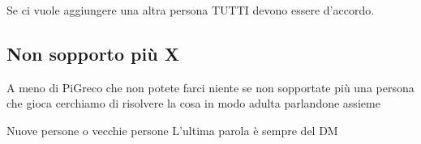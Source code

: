 Se ci vuole aggiungere una altra persona TUTTI devono essere d'accordo.

\subsection{Non sopporto più X}
A meno di PiGreco che non potete farci niente se non sopportate più una persona che gioca cerchiamo di risolvere la cosa in modo adulta parlandone assieme

\begin{DndComment}{Nuove persone o vecchie persone}
	L'ultima parola è sempre del DM
\end{DndComment}

